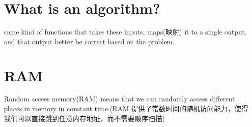 \documentclass[10.5pt,hyperref,a4paper,UTF8]{ctexart}
\begin{document}
\section{What is an algorithm?}
some kind of functions that takes these inputs, maps(映射) it to a single output, and that output better be correct based on the problem.
\section{RAM}
Random access memory(RAM) means that we can randomly access different places in memory in constant time.(RAM 提供了常数时间的随机访问能力，使得我们可以直接跳到任意内存地址，而不需要顺序扫描)

\newpage
{}
\end{document}
